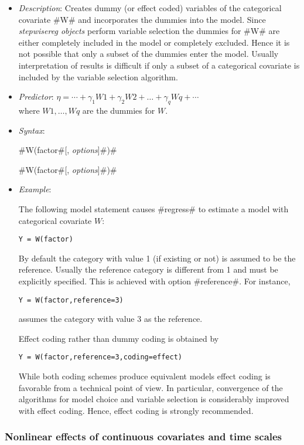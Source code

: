 \begin{itemize}
\item[] {\em Description}: Creates dummy (or effect coded) variables of the categorical covariate #W# and incorporates the dummies into the model.
Since {\em stepwisereg objects} perform variable selection the dummies for #W# are either completely included in the model or completely excluded.
Hence it is not possible that only a subset of the dummies enter the model.
Usually interpretation of results is difficult
if only a subset of a categorical covariate is included by the variable selection algorithm.
\item[] {\em Predictor}: $\eta =  \cdots + \gamma_1 W1 + \gamma_2 W2 + \dots + \gamma_q Wq + \cdots$ \\
where $W1,\dots,Wq$ are the dummies for $W$.
\item[] {\em Syntax}:

#W(factor#[, {\em options}]#)#

#W(factor#[, {\em options}]#)#
\item[] {\em Example}:

The following model statement causes #regress# to estimate a model
with categorical covariate $W$:

\texttt{Y = W(factor)}

By default the category with value 1 (if existing or not) is assumed to be the reference. Usually
the reference category is different from 1 and must be explicitly specified. This is achieved with option #reference#.
For instance,

\texttt{Y = W(factor,reference=3)}

assumes the category with value 3 as the reference.

Effect coding rather than dummy coding  is obtained by

\texttt{Y = W(factor,reference=3,coding=effect)}

While both coding schemes produce equivalent models effect coding is favorable from a technical point of view. In particular, convergence of the algorithms
for model choice and variable selection is considerably improved with effect coding. Hence, effect coding is strongly recommended.
\end{itemize}



\subsubsection*{Nonlinear effects of continuous covariates and time
scales}

